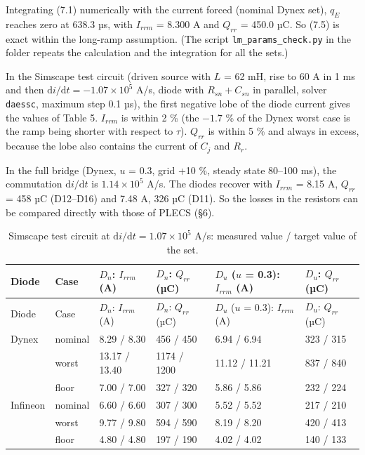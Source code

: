 \documentclass[11pt,a4paper,numbers=noenddot]{scrartcl}
\begin{document}
\begin{onehalfspace}
Integrating (7.1) numerically with the current forced (nominal Dynex set), \(q_E\) reaches zero at 638.3 µs, with \(I_{rrm}\) = 8.300 A and \(Q_{rr}\) = 450.0 µC. So (7.5) is exact within the long-ramp assumption. (The script \texttt{lm\_params\_check.py} in the folder repeats the calculation and the integration for all the sets.)

In the Simscape test circuit (driven source with \(L\) = 62 mH, rise to 60 A in 1 ms and then \(\mathrm{d}i/\mathrm{d}t = -1.07 \times 10^5\) A/s, diode with \(R_{sn} + C_{sn}\) in parallel, solver \texttt{daessc}, maximum step 0.1 µs), the first negative lobe of the diode current gives the values of Table 5. \(I_{rrm}\) is within 2 \% (the \(-1.7\) \% of the Dynex worst case is the ramp being shorter with respect to \(\tau\)). \(Q_{rr}\) is within 5 \% and always in excess, because the lobe also contains the current of \(C_j\) and \(R_r\).

In the full bridge (Dynex, \(u\) = 0.3, grid +10 \%, steady state 80--100 ms), the commutation \(\mathrm{d}i/\mathrm{d}t\) is \(1.14 \times 10^5\) A/s. The diodes recover with \(I_{rrm}\) = 8.15 A, \(Q_{rr}\) = 458 µC (D12--D16) and 7.48 A, 326 µC (D11). So the losses in the resistors can be compared directly with those of PLECS (\S6).

{\small\singlespacing
\begin{longtable}[]{@{}llllll@{}}
\caption{Simscape test circuit at \(\mathrm{d}i/\mathrm{d}t = 1.07 \times 10^5\) A/s: measured value / target value of the set.}\tabularnewline
\toprule\noalign{}
Diode & Case & \(D_n\): \(I_{rrm}\) (A) & \(D_n\): \(Q_{rr}\) (µC) & \(D_u\) (\(u\) = 0.3): \(I_{rrm}\) (A) & \(D_u\): \(Q_{rr}\) (µC) \\
\midrule\noalign{}
\endfirsthead
\toprule\noalign{}
Diode & Case & \(D_n\): \(I_{rrm}\) (A) & \(D_n\): \(Q_{rr}\) (µC) & \(D_u\) (\(u\) = 0.3): \(I_{rrm}\) (A) & \(D_u\): \(Q_{rr}\) (µC) \\
\midrule\noalign{}
\endhead
\bottomrule\noalign{}
\endlastfoot
Dynex & nominal & 8.29 / 8.30 & 456 / 450 & 6.94 / 6.94 & 323 / 315 \\
& worst & 13.17 / 13.40 & 1174 / 1200 & 11.12 / 11.21 & 837 / 840 \\
& floor & 7.00 / 7.00 & 327 / 320 & 5.86 / 5.86 & 232 / 224 \\
Infineon & nominal & 6.60 / 6.60 & 307 / 300 & 5.52 / 5.52 & 217 / 210 \\
& worst & 9.77 / 9.80 & 594 / 590 & 8.19 / 8.20 & 420 / 413 \\
& floor & 4.80 / 4.80 & 197 / 190 & 4.02 / 4.02 & 140 / 133 \\
\end{longtable}
}


\end{onehalfspace}
\end{document}
